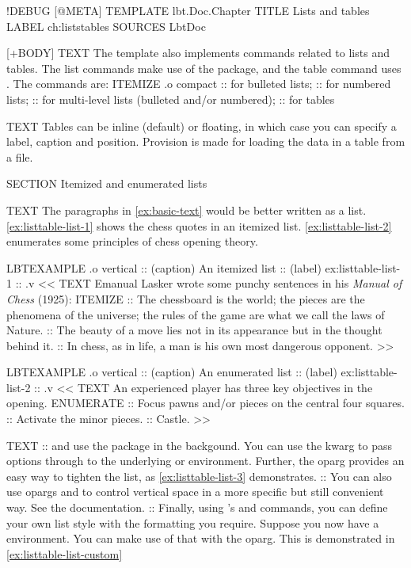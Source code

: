 \begin{lbt}
  !DEBUG
  [@META]
    TEMPLATE lbt.Doc.Chapter
    TITLE Lists and tables
    LABEL ch:liststables
    SOURCES LbtDoc

  [+BODY]
    TEXT The  template also implements commands related to lists and tables. The list commands make use of the  package, and the table command uses . The commands are:
    ITEMIZE .o compact
    ::  for bulleted lists;
    ::  for numbered lists;
    ::  for multi-level lists (bulleted and/or numbered);
    ::  for tables

    TEXT Tables can be inline (default) or floating, in which case you can specify a label, caption and position. Provision is made for loading the data in a table from a file.

    SECTION Itemized and enumerated lists

    TEXT The paragraphs in \vref{ex:basic-text} would be better written as a list. \vref{ex:listtable-list-1} shows the chess quotes in an itemized list. \vref{ex:listtable-list-2} enumerates some principles of chess opening theory.

    LBTEXAMPLE .o vertical
    :: (caption) An itemized list
    :: (label) ex:listtable-list-1
    :: .v <<
      TEXT Emanual Lasker wrote some punchy sentences in his \emph{Manual of Chess} (1925):
      ITEMIZE
      :: The chessboard is the world; the pieces are the phenomena of the universe; the rules of the game are what we call the laws of Nature.
      :: The beauty of a move lies not in its appearance but in the thought behind it.
      :: In chess, as in life, a man is his own most dangerous opponent.
    >>

    LBTEXAMPLE .o vertical
    :: (caption) An enumerated list
    :: (label) ex:listtable-list-2
    :: .v <<
      TEXT An experienced player has three key objectives in the opening.
      ENUMERATE
      :: Focus pawns and/or pieces on the central four squares.
      :: Activate the minor pieces.
      :: Castle.
    >>

    TEXT
    ::  and  use the  package in the backgound. You can use the kwarg  to pass options through to the underlying  or  environment. Further, the oparg  provides an easy way to tighten the list, as \vref{ex:listtable-list-3} demonstrates.
    :: You can also use opargs  and  to control vertical space in a more specific but still convenient way. See the documentation.
    :: Finally, using 's  and  commands, you can define your own list style with the formatting you require. Suppose you now have a  environment. You can make use of that with the  oparg. This is demonstrated in \vref{ex:listtable-list-custom}


\end{lbt}
